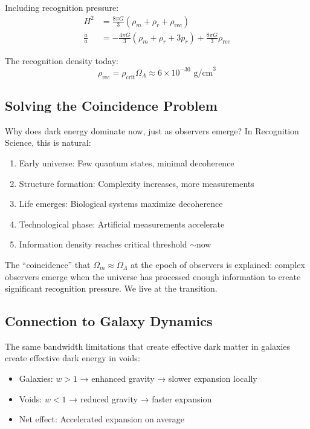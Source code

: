\documentclass[12pt,letterpaper]{article}
\begin{document}
Including recognition pressure:
\begin{align}
H^2 &= \frac{8\pi G}{3}(\rho_m + \rho_r + \rho_{\text{rec}}) \\
\frac{\ddot{a}}{a} &= -\frac{4\pi G}{3}(\rho_m + \rho_r + 3p_r) + \frac{8\pi G}{3}\rho_{\text{rec}}
\end{align}

The recognition density today:
\begin{equation}
\rho_{\text{rec}} = \rho_{\text{crit}} \Omega_\Lambda \approx 6 \times 10^{-30} \text{ g/cm}^3
\end{equation}

\subsection{Solving the Coincidence Problem}

Why does dark energy dominate now, just as observers emerge? In Recognition Science, this is natural:

\begin{enumerate}
    \item Early universe: Few quantum states, minimal decoherence
    \item Structure formation: Complexity increases, more measurements
    \item Life emerges: Biological systems maximize decoherence
    \item Technological phase: Artificial measurements accelerate
    \item Information density reaches critical threshold $\sim$now
\end{enumerate}

\begin{tcolorbox}[keyresult]
The ``coincidence'' that $\Omega_m \approx \Omega_\Lambda$ at the epoch of observers is explained: complex observers emerge when the universe has processed enough information to create significant recognition pressure. We live at the transition.
\end{tcolorbox}

\subsection{Connection to Galaxy Dynamics}

The same bandwidth limitations that create effective dark matter in galaxies create effective dark energy in voids:

\begin{itemize}
    \item Galaxies: $w > 1$ → enhanced gravity → slower expansion locally
    \item Voids: $w < 1$ → reduced gravity → faster expansion
    \item Net effect: Accelerated expansion on average
\end{itemize}
\end{document}
